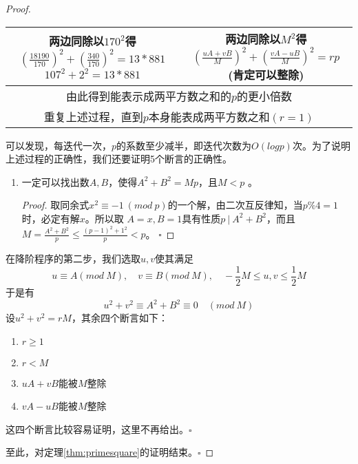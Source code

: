 \begin{proof}
\begin{enumerate}
\begin{table}[!htbp]
\begin{spacing}{1.5}
\begin{tabular}{|c|c|}
				\midrule[1pt]
				\tabincell{c}{两边同除以$170^2$得 \\ $(\frac{18190}{170})^2 + (\frac{340}{170})^2 = 13*881$ \\ $107^2 + 2^2 = 13*881$} & 
				\tabincell{c}{两边同除以$M^2$得 \\ $(\frac{uA+vB}{M})^2 + (\frac{vA-uB}{M})^2 = rp$ \\ (肯定可以整除) }  \\
				\midrule[1pt]
				\multicolumn{2}{|c|}{由此得到能表示成两平方数之和的$p$的更小倍数} \\
				\midrule[1pt]
				\multicolumn{2}{|c|}{重复上述过程，直到$p$本身能表成两平方数之和$(r=1)$} \\
				\bottomrule[1pt]
			\end{tabular}%
		\end{spacing}
	\end{table}%
	
	可以发现，每迭代一次，$p$的系数至少减半，即迭代次数为$O(logp)$次。为了说明上述过程的正确性，我们还要证明5个断言的正确性。
	\begin{enumerate}
		\item 一定可以找出数$A,B$，使得$A^2+B^2=Mp$，且$M<p$ 。
		\begin{proof}
			取同余式$x^2\equiv -1\ (mod \ p)$的一个解，由二次互反律知，当$p\%4=1$时，必定有解$x$。所以取
			$A=x,B=1$具有性质$p\ | \ A^2+B^2$，而且$M=\frac{A^2+B^2}{p}\le \frac{(p-1)^2+1^2}{p}<p$。
			$\square$ 
		\end{proof}
	\end{enumerate}


	在降阶程序的第二步，我们选取$u,v$使其满足
	$$
	u\equiv A (mod \ M),\quad v\equiv B(mod \ M), \quad -\frac{1}{2}M\le u,v\le \frac{1}{2}M
	$$
	于是有
	$$
	u^2+v^2\equiv A^2+B^2\equiv 0 \quad (mod \ M )
	$$
	设$u^2+v^2=rM$，其余四个断言如下：
	\begin{enumerate}[resume] %
		\item $r\ge1$
		\item $r<M$ 
		\item $uA+vB$能被$M$整除
		\item $vA-uB$能被$M$整除
	\end{enumerate}
	这四个断言比较容易证明，这里不再给出。$\square$
\end{enumerate}
	至此，对定理\ref{thm:primesquare}的证明结束。$\square$
\end{proof}

\vbox{}

